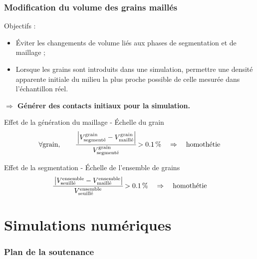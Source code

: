 \documentclass[8pt]{beamer}
\begin{document}
\begin{frame}
	\frametitle{Modification du volume des grains maillés}
	\vfill
	\begin{block}{Objectifs :}
		\begin{itemize}[label=$\rightarrow$]
			\item \'Eviter les changements de volume liés aux phases de segmentation et de maillage ;
			\item Lorsque les grains sont introduits dans une simulation, permettre une densité apparente initiale du milieu la plus proche possible de celle mesurée dans l'échantillon réel.
		\end{itemize}
		\begin{center}
			\textbf{$\Rightarrow$ Générer des contacts initiaux pour la simulation.}
		\end{center}
	\end{block}\vfill
	\begin{block}{Effet de la génération du maillage - \'Echelle du grain}
		$$
		\forall \text{grain},\qquad
		\cfrac{\left|V_\text{segmenté}^\text{grain}-V_\text{maillé}^\text{grain}\right|}{V_\text{segmenté}^\text{grain}} > \SI{0.1}{\percent}
		\quad\Rightarrow\quad\text{homothétie}
		$$
	\end{block}\vfill
	\begin{block}{Effet de la segmentation - \'Echelle de l'ensemble de grains}
		$$
		\cfrac{\left|V_\text{seuillé}^\text{ensemble}-V_\text{maillé}^\text{ensemble}\right|}{V_\text{seuillé}^\text{ensemble}} > \SI{0.1}{\percent}
		\quad\Rightarrow\quad\text{homothétie}
		$$
	\end{block}\vfill
\end{frame}

\section[Simulations numériques]{Simulations numériques}
\begin{frame}
	\frametitle{Plan de la soutenance}
	\tableofcontents[currentsection]
\end{frame}
\end{document}
